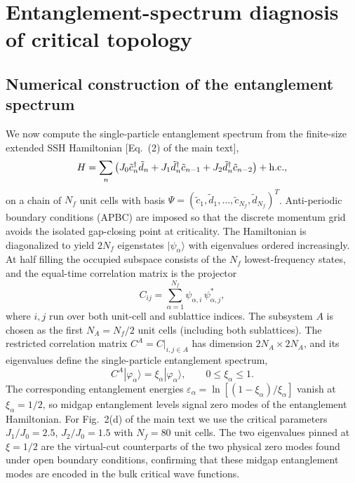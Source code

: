 \documentclass[aps,prl,twocolumn,preprintnumbers,amsmath,amssymb,superscriptaddress,10pt]{revtex4-2}
\begin{document}
\section{Entanglement-spectrum diagnosis of critical topology}
\label{sec:entanglement_spectrum}


\subsection{Numerical construction of the entanglement spectrum}
\label{app:ES_calculation}

We now compute the single-particle entanglement spectrum from the
finite-size extended SSH Hamiltonian [Eq.~(2) of the main text],
\begin{equation}
H=
\sum_n
\left(
J_0 \tilde c_n^\dagger \tilde d_n
+
J_1 \tilde d_n^\dagger \tilde c_{n-1}
+
J_2 \tilde d_n^\dagger \tilde c_{n-2}
\right)
+{\rm h.c.},
\label{eq:app_real_space_SSH}
\end{equation}
on a chain of $N_f$ unit cells with basis
$\Psi=(\tilde c_1,\tilde d_1,\ldots,
\tilde c_{N_f},\tilde d_{N_f})^T$. Anti-periodic boundary conditions
(APBC) are imposed so that the discrete momentum grid avoids the isolated gap-closing point at criticality. The Hamiltonian is diagonalized to yield $2N_f$ eigenstates $|\psi_\alpha\rangle$ with eigenvalues ordered increasingly. At half filling the occupied subspace consists of the $N_f$ lowest-frequency states, and the equal-time correlation matrix is the projector
\begin{equation}
C_{ij}
=
\sum_{\alpha=1}^{N_f}
\psi_{\alpha,i}\,\psi_{\alpha,j}^{*},
\label{eq:app_C_full}
\end{equation}
where $i,j$ run over both unit-cell and sublattice indices.
The subsystem $A$ is chosen as the first $N_A=N_f/2$ unit cells (including both sublattices). The restricted correlation matrix $C^A=C\big|_{i,j\in A}$ has dimension $2N_A\times 2N_A$, and its eigenvalues define the single-particle entanglement spectrum,
\begin{equation}
C^A|\varphi_\alpha\rangle
=
\xi_\alpha|\varphi_\alpha\rangle ,
\qquad
0\leq \xi_\alpha\leq1 .
\label{eq:app_CA_diag}
\end{equation}
The corresponding entanglement energies
$\varepsilon_\alpha=\ln[(1-\xi_\alpha)/\xi_\alpha]$
vanish at $\xi_\alpha=1/2$, so midgap entanglement levels signal zero modes of the entanglement Hamiltonian. For Fig.~2(d) of the main text we use the critical parameters $J_1/J_0=2.5$, $J_2/J_0=1.5$ with $N_f=80$ unit cells. The two eigenvalues pinned at $\xi=1/2$ are the virtual-cut counterparts of the two physical zero modes found under open boundary conditions, confirming that these midgap entanglement modes are encoded in the bulk critical wave functions.
\end{document}
